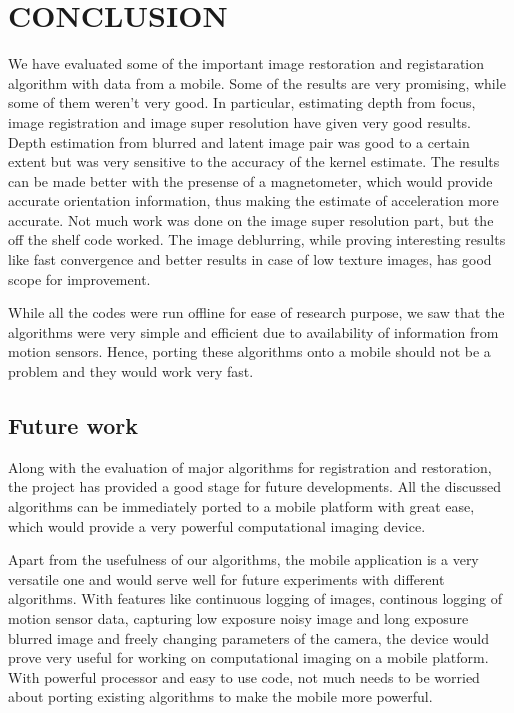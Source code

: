 \documentclass[BTech]{iitmdiss}
\begin{document}
\chapter{CONCLUSION}
\label{chap:conclusion}
We have evaluated some of the important image restoration and registaration
algorithm with data from a mobile. Some of the results are very promising,
while some of them weren't very good. In particular, estimating depth
from focus, image registration and image super resolution have given 
very good results. Depth estimation from blurred and latent image pair
was good to a certain extent but was very sensitive to the accuracy of
the kernel estimate. The results can be made better with the presense
of a magnetometer, which would provide accurate orientation information,
thus making the estimate of acceleration more accurate. Not much work
was done on the image super resolution part, but the off the shelf code
worked. The image deblurring, while proving interesting results like fast
convergence and better results in case of low texture images, has good 
scope for improvement.

While all the codes were run offline for ease of research purpose, we 
saw that the algorithms were very simple and efficient due to availability
of information from motion sensors. Hence, porting these algorithms onto
a mobile should not be a problem and they would work very fast.  

\section{Future work}
Along with the evaluation of major algorithms for registration and 
restoration, the project has provided a good stage for future developments.
All the discussed algorithms can be immediately ported to a mobile 
platform with great ease, which would provide a very powerful 
computational imaging device.

Apart from the usefulness of our algorithms, the mobile application is a
very versatile one and would serve well for future experiments with 
different algorithms. With features like continuous logging of images, 
continous logging of motion sensor data, capturing low exposure noisy 
image and long exposure blurred image and freely changing parameters of 
the camera, the device would prove very useful for working on 
computational imaging on a mobile platform. With powerful processor and
easy to use code, not much needs to be worried about porting existing 
algorithms to make the mobile more powerful.
\end{document}

